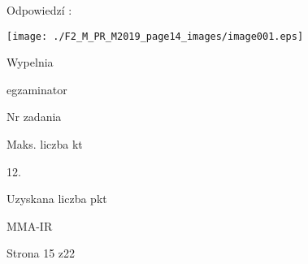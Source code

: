 \documentclass[a4paper,12pt]{article}
\begin{document}
Odpowiedzí :
\begin{center}
\texttt{[image: ./F2\_M\_PR\_M2019\_page14\_images/image001.eps]}
\end{center}
Wypelnia

egzaminator

Nr zadania

Maks. liczba kt

12.

Uzyskana liczba pkt

MMA-IR

Strona 15 z22
\end{document}
